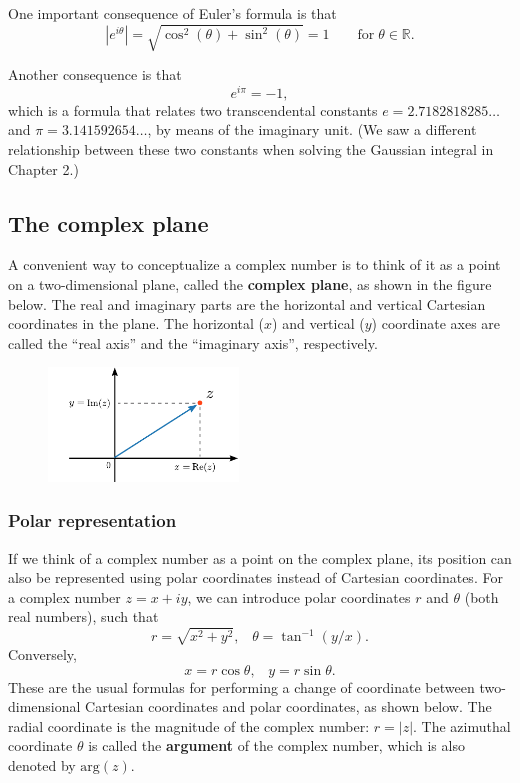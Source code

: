 \documentclass[10pt,a4paper]{article}
\begin{document}
One important consequence of Euler's formula is that
\begin{equation}
  \left|e^{i\theta}\right| = \sqrt{\cos^2(\theta) + \sin^2(\theta)}
  = 1 \qquad \mathrm{for}\; \theta \in \mathbb{R}.
\end{equation}

Another consequence is that
\begin{equation}
e^{i\pi} = -1,
\end{equation}
which is a formula that relates two transcendental constants $e =
2.7182818285\dots$ and $\pi = 3.141592654\dots$, by means of the
imaginary unit. (We saw a different relationship between these two
constants when solving the Gaussian integral in Chapter 2.)

\subsection{The complex plane}
\label{the-complex-plane}

A convenient way to conceptualize a complex number is to think of it
as a point on a two-dimensional plane, called the \textbf{complex
  plane}, as shown in the figure below.  The real and imaginary parts
are the horizontal and vertical Cartesian coordinates in the
plane. The horizontal ($x$) and vertical ($y$) coordinate axes are
called the ``real axis'' and the ``imaginary axis'', respectively.

\begin{figure}[ht]
  \centering\includegraphics[width=0.45\textwidth]{complex_plane}
\end{figure}

\subsubsection{Polar representation}
\label{polar-representation}

If we think of a complex number as a point on the complex plane, its
position can also be represented using polar coordinates instead of
Cartesian coordinates. For a complex number $z = x + i y$, we can
introduce polar coordinates $r$ and $\theta$ (both real numbers), such
that
\begin{equation}
r = \sqrt{x^2 + y^2}, \;\;\; \theta = \tan^{-1}(y/x).
\end{equation}
Conversely,
\begin{equation}
x = r\cos\theta, \;\;\; y = r\sin\theta.
\end{equation}
These are the usual formulas for performing a change of coordinate
between two-dimensional Cartesian coordinates and polar coordinates,
as shown below. The radial coordinate is the magnitude of the complex
number: $r = |z|$. The azimuthal coordinate $\theta$ is called the
\textbf{argument} of the complex number, which is also denoted by
$\mathrm{arg}(z)$.
\end{document}
